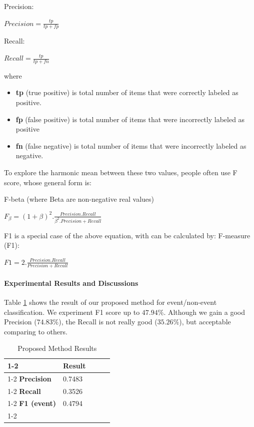 \documentclass{llncs}
\begin{document}
Precision: 
\begin{center}
$Precision = \frac{tp}{tp + fp} $
\end{center}

Recall:
\begin{center}
$Recall = \frac{tp}{tp + fn} $
\end{center}

where 
\begin{itemize}
\item \textbf{tp} (true positive) is total number of items that were correctly labeled as positive. 
\item \textbf{fp} (false positive) is total number of items that were incorrectly labeled as positive
\item \textbf{fn} (false negative) is total number of items that were incorrectly labeled as negative.
\end{itemize}

To explore the harmonic mean between these two values, people often use F score, whose general form is:  

F-beta (where Beta are non-negative real values)
\begin{center}
$F_\beta = (1+ \beta)^2.\frac{Precision . Recall}{\beta^2 .Precision + Recall} $
\end{center}

F1 is a special case of the above equation, with can be calculated by:
F-measure (F1):
\begin{center}
$F1 = 2.\frac{Precision . Recall}{Precision + Recall} $
\end{center}

\paragraph{Experimental Results and Discussions}

Table \ref{tab1} shows the result of our proposed method for event/non-event classification. We experiment F1 score up to $47.94\%$. Although we gain a good Precision ($74.83\%$), the Recall is not really good ($35.26\%$), but acceptable comparing to others. 

\begin{table}[htb]
\caption{Proposed Method Results}
\begin{center}
\begin{tabular}{|l|l|lll}
\cline{1-2}
                   & \textbf{Result} &  &  &  \\ \cline{1-2}
\textbf{Precision}  & 0.7483          &  &  &  \\ \cline{1-2}
\textbf{Recall}     & 0.3526          &  &  &  \\ \cline{1-2}
\textbf{F1 (event)} & 0.4794          &  &  &  \\ \cline{1-2}
\end{tabular}
\end{center}
\label{tab1}
\end{table}
\end{document}
